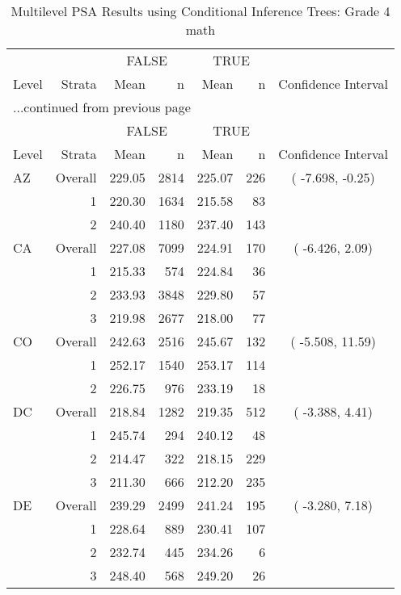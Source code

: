 \begin{longtable}{lrrr@{\extracolsep{.25cm}}rrc}
\caption{Multilevel PSA Results using Conditional Inference Trees: Grade 4 math} \\ 
   \hline & & \multicolumn{2}{c}{FALSE} & \multicolumn{2}{c}{TRUE} & \\ \cline{3-4} \cline{5-6} Level & Strata & Mean & n & Mean & n & Confidence Interval \\ \hline\endfirsthead \multicolumn{7}{l}{{...continued from previous page}}\\ \hline  & & \multicolumn{2}{c}{FALSE} & \multicolumn{2}{c}{TRUE} & \\ \cline{3-4} \cline{5-6} Level & Strata & Mean & n & Mean & n & Confidence Interval \\ \hline \endhead \endfoot \endlastfoot  \hline
AZ & Overall & 229.05 & 2814 & 225.07 & 226 & ( -7.698, -0.25) \\ 
   & 1 & 220.30 & 1634 & 215.58 &  83 &  \\ 
   & 2 & 240.40 & 1180 & 237.40 & 143 &  \\ 
   \hline
CA & Overall & 227.08 & 7099 & 224.91 & 170 & ( -6.426,  2.09) \\ 
   & 1 & 215.33 & 574 & 224.84 &  36 &  \\ 
   & 2 & 233.93 & 3848 & 229.80 &  57 &  \\ 
   & 3 & 219.98 & 2677 & 218.00 &  77 &  \\ 
   \hline
CO & Overall & 242.63 & 2516 & 245.67 & 132 & ( -5.508, 11.59) \\ 
   & 1 & 252.17 & 1540 & 253.17 & 114 &  \\ 
   & 2 & 226.75 & 976 & 233.19 &  18 &  \\ 
   \hline
DC & Overall & 218.84 & 1282 & 219.35 & 512 & ( -3.388,  4.41) \\ 
   & 1 & 245.74 & 294 & 240.12 &  48 &  \\ 
   & 2 & 214.47 & 322 & 218.15 & 229 &  \\ 
   & 3 & 211.30 & 666 & 212.20 & 235 &  \\ 
   \hline
DE & Overall & 239.29 & 2499 & 241.24 & 195 & ( -3.280,  7.18) \\ 
   & 1 & 228.64 & 889 & 230.41 & 107 &  \\ 
   & 2 & 232.74 & 445 & 234.26 &   6 &  \\ 
   & 3 & 248.40 & 568 & 249.20 &  26 &  \\ 

\end{longtable}
